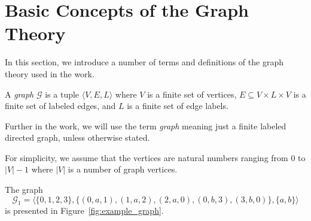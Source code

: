 \section{Basic Concepts of the Graph Theory}\label{sec:ch1/sec2}
In this section, we introduce a number of terms and definitions of the graph theory used in the work.

\begin{definition}[A graph]  
	A \textit{graph} $\mathcal{G}$ is a tuple $\langle V, E, L \rangle$ where $V$ is a finite set of vertices, $E \subseteq V \times L \times V$ is a finite set of labeled edges, and $L$ is a finite set of edge labels.
\end{definition}

Further in the work, we will use the term \textit{graph} meaning just a finite labeled directed graph, unless otherwise stated.

For simplicity, we assume that the vertices are natural numbers ranging from 0 to $|V| - 1$ where $|V|$ is a number of graph vertices.

\begin{example}
	The graph $$\mathcal{G}_1 = \langle \{0, 1, 2, 3\}, \{(0, a, 1), (1, a, 2), (2, a, 0), (0, b, 3), (3, b, 0)\}, \{a, b\} \rangle$$ is presented in Figure~\ref{fig:example_graph}.
\end{example}

